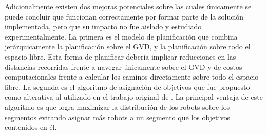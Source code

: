 
Adicionalmente existen dos mejoras potenciales sobre las cuales únicamente se
puede concluir que funcionan correctamente por formar parte de la solución
implementada, pero que su impacto no fue aislado y estudiado experimentalmente.
La primera es el modelo de planificación que combina jerárquicamente la
planificación sobre el GVD, y la planificación sobre todo el espacio libre.
Esta forma de planificar debería implicar reducciones en las distancias
recorridas frente a navegar únicamente sobre el GVD y de costos computacionales
frente a calcular los caminos directamente sobre todo el espacio libre. La
segunda es el algoritmo de asignación de objetivos que fue propuesto como
alterativa al utilizado en el trabajo original de \cite{wurm2008coordinated}.
La principal ventaja de este algoritmo es que logra maximizar la distribución
de los robots sobre los segmentos evitando asignar más robots a un segmento que
los objetivos contenidos en él.







